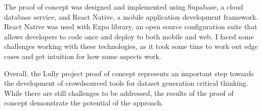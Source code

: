 \documentclass{report}
\begin{document}
The proof of concept was designed and implemented using Supabase, a cloud database service, and React Native, a mobile application development framework. React Native was used with Expo library, an open source configuration suite that allows developers to code once and deploy to both mobile and web. I faced some challenges working with these technologies, as it took some time to work out edge cases and get intuition for how some aspects work.


Overall, the Lully project proof of concept represents an important step towards the development of crowdsourced tools for dataset generation critical thinking. While there are still challenges to be addressed, the results of the proof of concept demonstrate the potential of the approach.


\printbibliography
\end{document}
